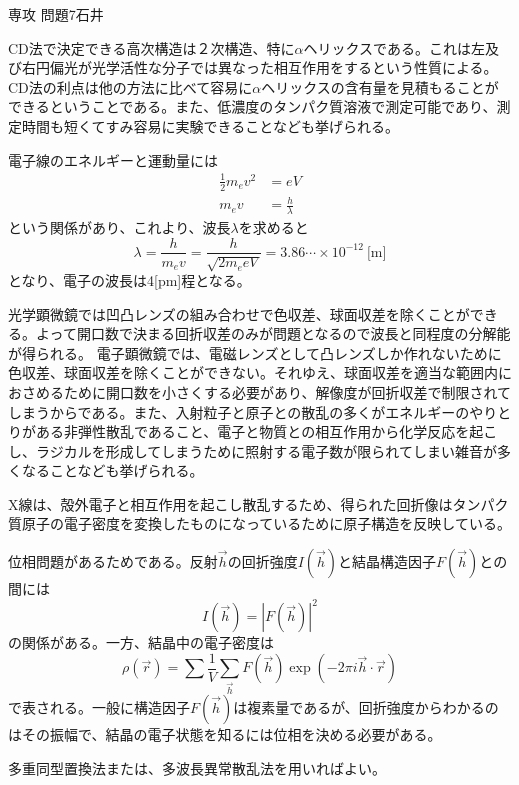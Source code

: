 \documentclass[fleqn]{jbook}
\begin{document}
\begin{answer}{専攻 問題7}{石井}
\begin{subanswers}
\SubAnswer
CD法で決定できる高次構造は２次構造、特に$\alpha$ヘリックスである。これは左及び右円偏光が光学活性な分子では異なった相互作用をするという性質による。CD法の利点は他の方法に比べて容易に$\alpha$ヘリックスの含有量を見積もることができるということである。また、低濃度のタンパク質溶液で測定可能であり、測定時間も短くてすみ容易に実験できることなども挙げられる。

\SubAnswer
\begin{subsubanswers}
\SubSubAnswer
電子線のエネルギーと運動量には
\begin{align*}
\frac{1}{2}m_{e}v^{2} &= eV  \\
m_{e}v &= \frac{h}{\lambda} 
\end{align*}
という関係があり、これより、波長$\lambda$を求めると
\[ \lambda = \frac{h}{m_e v}=\frac{h}{\sqrt{2m_e eV}}= 3.86 \cdots \times 10^{-12}~\text{[m]}  \]
となり、電子の波長は4[pm]程となる。

\SubSubAnswer
光学顕微鏡では凹凸レンズの組み合わせで色収差、球面収差を除くことができる。よって開口数で決まる回折収差のみが問題となるので波長と同程度の分解能が得られる。
電子顕微鏡では、電磁レンズとして凸レンズしか作れないために色収差、球面収差を除くことができない。それゆえ、球面収差を適当な範囲内におさめるために開口数を小さくする必要があり、解像度が回折収差で制限されてしまうからである。また、入射粒子と原子との散乱の多くがエネルギーのやりとりがある非弾性散乱であること、電子と物質との相互作用から化学反応を起こし、ラジカルを形成してしまうために照射する電子数が限られてしまい雑音が多くなることなども挙げられる。
\end{subsubanswers}

\SubAnswer
\begin{subsubanswers}
\SubSubAnswer
X線は、殻外電子と相互作用を起こし散乱するため、得られた回折像はタンパク質原子の電子密度を変換したものになっているために原子構造を反映している。

\SubSubAnswer
位相問題があるためである。反射$\vec{h}$の回折強度$I(\vec{h})$と結晶構造因子$F(\vec{h})$との間には
\[  I(\vec{h})=|F(\vec{h})|^{2}  \]
の関係がある。一方、結晶中の電子密度は
\[   \rho (\vec{r})= \sum \frac{1}{V} \sum_{\vec{h}} F(\vec{h}) \exp(- 2 \pi i \vec{h} \cdot \vec{r})  \]
で表される。一般に構造因子$F(\vec{h})$は複素量であるが、回折強度からわかるのはその振幅で、結晶の電子状態を知るには位相を決める必要がある。

\SubSubAnswer
多重同型置換法または、多波長異常散乱法を用いればよい。


\end{subsubanswers}
\end{subanswers}
\end{answer}
\end{document}
